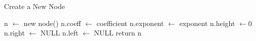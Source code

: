 \begin{algorithm}[H]
    \caption{Create a New Node} \label{create_node}
    \begin{algorithmic}
    \State n $\gets$ new node() 
    \State n.coeff $\gets$ coefficient
    \State n.exponent $\gets$ exponent
    \State n.height $\gets 0$
    \State n.right $\gets$ NULL
    \State n.left $\gets$ NULL
    \State return n
    \EndProcedure
\end{algorithmic}

\end{algorithm}